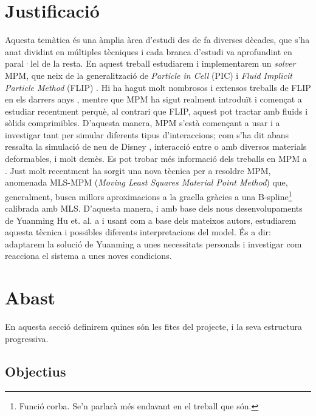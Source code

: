 \documentclass[a4paper]{report}
\begin{document}
	\section{Justificació}
	Aquesta temàtica és una àmplia àrea d'estudi des de fa diverses dècades, que s'ha anat dividint en múltiples tècniques i cada branca d'estudi va aprofundint en paral·lel de la resta.
	\newline
	En aquest treball estudiarem i implementarem un \textit{solver} MPM, que neix de la generalització de \textit{Particle in Cell} (PIC) i \textit{Fluid Implicit Particle Method} (FLIP) \cite{Sulsky1995}. Hi ha hagut molt nombrosos i extensos treballs de FLIP en els darrers anys \cite{Bridson2018,Zhu2005}, mentre que MPM ha sigut realment introduït i començat a estudiar recentment perquè, al contrari que FLIP, aquest pot tractar amb fluids i sòlids comprimibles.
	\newline
	D'aquesta manera, MPM s'està començant a usar i a investigar tant per simular diferents tipus d'interaccions; com s'ha dit abans ressalta la simulació de neu de Disney \cite{Stomakhin}, interacció entre o amb diversos materials deformables\cite{Hegemann2013}, i molt demès. Es pot trobar més informació dels treballs en MPM a \cite{Jiang2016}.
	\newline
	Just molt recentment ha sorgit una nova tècnica per a resoldre MPM, anomenada MLS-MPM (\textit{Moving Least Squares Material Point Method})\cite{hu2018mlsmpmcpic} que, generalment, busca millors aproximacions a la graella gràcies a una B-spline\footnote{Funció corba. Se'n parlarà més endavant en el treball que són.} calibrada amb MLS.
	\newline
	D'aquesta manera, i amb base dels nous desenvolupaments de Yuanming Hu et. al. a \cite{hu2018mlsmpmcpic} i usant com a base \cite{Hu} dels mateixos autors, estudiarem aquesta tècnica i possibles diferents interpretacions del model. És a dir: adaptarem la solució de Yuanming a unes necessitats personals i investigar com reacciona el sistema a unes noves condicions.
	
	\section{Abast}
	En aquesta secció definirem quines són les fites del projecte, i la seva estructura progressiva.
	\subsection{Objectius}
\end{document}
